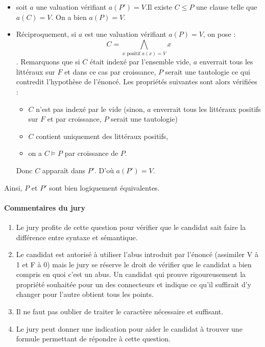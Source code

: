 \documentclass[a4paper, 11pt]{article}
\begin{document}
\begin{enumerate}
\begin{enumerate}
         \begin{itemize}
             \item soit $a$ une valuation vérifiant  $a(P')=V$.Il existe  $C\leq P$ une clause telle que  $a(C)=V$. On a bien $a(P)=V$.
             \item Réciproquement, si $a$ est une valuation vérifiant $a(P)=V$, on pose :
                 $$C = \bigwedge_{x \mbox{ positif }  a(x)=V}x$$. 
                 Remarquons que si $C$ était indexé par l'ensemble vide, $a$ enverrait tous les littéraux sur $F$ et dans ce cas par croissance, 
                 $P$ serait une tautologie ce qui contredit l'hypothèse de l'énoncé. 
                 Les propriétés suivantes sont alors vérifiées :
                 \begin{itemize}
                     \item $C$ n'est pas indexé par le vide (sinon, $a$ enverrait tous les littéraux positifs sur $F$ et par croissance, $P$ serait une tautologie)
                     \item $C$ contient uniquement des littéraux positifs,
                     \item on a $C \vDash P$ par croissance de $P$.
                 \end{itemize}
                  Donc  $C$ apparaît dans  $P'$. D'où  $a(P')=V$.
        \end{itemize}
        Ainsi, $P$ et  $P'$ sont bien logiquement équivalentes. 
\end{enumerate}         
\end{enumerate}   

\paragraph{Commentaires du jury}

\begin{enumerate}
\item Le jury profite de cette question pour vérifier que le candidat sait faire la différence entre syntaxe et sémantique.
\item Le candidat est autorisé à utiliser l'abus introduit par l'énoncé (assimiler V à 1 et F à 0) mais le jury se réserve le droit de vérifier que le candidat a bien compris en quoi c'est un abus. Un candidat qui prouve rigoureusement la propriété souhaitée pour un des connecteurs et indique ce qu'il suffirait d'y changer pour l'autre obtient tous les points.
\item Il ne faut pas oublier de traiter le caractère nécessaire et suffisant.
\item Le jury peut donner une indication pour aider le candidat à trouver une formule permettant de répondre à cette question.
\end{enumerate}
\end{document}
